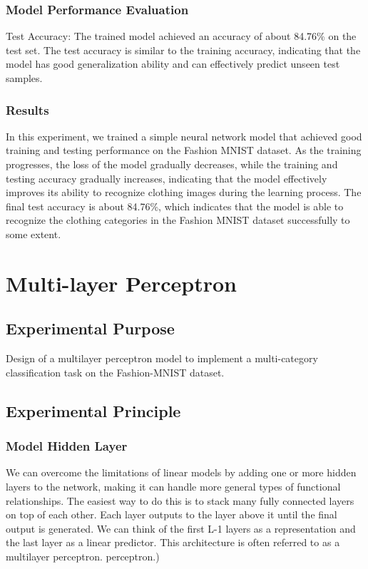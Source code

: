 \documentclass[a4paper,12pt]{article}
\begin{document}
\subsubsection{Model Performance Evaluation}
Test Accuracy:
The trained model achieved an accuracy of about 84.76\% on the test set.
The test accuracy is similar to the training accuracy, indicating that the model has good generalization ability and can effectively predict unseen test samples.

\subsubsection{Results}
In this experiment, we trained a simple neural network model that achieved good training and testing performance on the Fashion MNIST dataset.
As the training progresses, the loss of the model gradually decreases, while the training and testing accuracy gradually increases, indicating that the model effectively improves its ability to recognize clothing images during the learning process.
The final test accuracy is about 84.76\%, which indicates that the model is able to recognize the clothing categories in the Fashion MNIST dataset successfully to some extent.

\newpage
\section{Multi-layer Perceptron}
\subsection{Experimental Purpose}
Design of a multilayer perceptron model to implement a multi-category classification task on the Fashion-MNIST dataset.
\subsection{Experimental Principle}
\subsubsection{Model Hidden Layer}
We can overcome the limitations of linear models by adding one or more hidden layers to the network, making it
can handle more general types of functional relationships. The easiest way to do this is to stack many fully connected layers
on top of each other. Each layer outputs to the layer above it until the final output is generated. We can think of the first L-1 layers
as a representation and the last layer as a linear predictor. This architecture is often referred to as a multilayer perceptron.
perceptron.)
\end{document}
